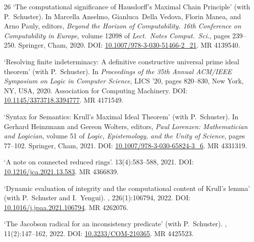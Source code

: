 \documentclass[a4paper]{article}
\begin{document}
\begin{flushleft}
\begin{thebibliography}{26}
\newblock `The computational significance of {H}ausdorff's {M}aximal {C}hain {P}rinciple' (with P.~Schuster).
\newblock In Marcella Anselmo, Gianluca~Della Vedova, Florin Manea, and Arno
  Pauly, editors, {\em Beyond the Horizon of Computability. 16th Conference on
  Computability in Europe}, volume 12098 of {\em Lect.~Notes Comput.~Sci.},
  pages 239--250. Springer, Cham, 2020.
\newblock DOI: \href{https://doi.org/10.1007/978-3-030-51466-2_21}{10.1007/978-3-030-51466-2\_21}.
\newblock MR 4139540.

\newblock `Resolving finite indeterminacy: A definitive constructive universal prime ideal theorem' (with P.~Schuster).
\newblock In {\em Proceedings of the 35th Annual ACM/IEEE Symposium on Logic in
  Computer Science}, LICS '20, pages 820--830, New York, NY, USA, 2020.
  Association for Computing Machinery.
\newblock DOI: \href{https://doi.org/10.1145/3373718.3394777}{10.1145/3373718.3394777}.
\newblock MR 4171549.

\newblock `Syntax for {S}emantics: {K}rull's {M}aximal {I}deal {T}heorem' (with P.~Schuster).
\newblock In Gerhard Heinzmann and Gereon Wolters, editors, {\em Paul Lorenzen:
  Mathematician and Logician}, volume 51 of {\em Logic, Epistemology, and the Unity of Science},
  pages 77--102. Springer, Cham, 2021.
\newblock DOI: \href{https://doi.org/10.1007/978-3-030-65824-3_6}{10.1007/978-3-030-65824-3\_6}.
\newblock MR 4331319.

\newblock `A note on connected reduced rings'.
 13(4):583--588, 2021.
\newblock DOI: \href{https://doi.org/10.1216/jca.2021.13.583}{10.1216/jca.2021.13.583}.
\newblock MR 4366839.

\newblock `Dynamic evaluation of integrity and the computational content of {K}rull's lemma' (with P.~Schuster and I.~Yengui).
, 226(1):106794, 2022.
\newblock DOI: \href{https://doi.org/10.1016/j.jpaa.2021.106794}{10.1016/j.jpaa.2021.106794}.
\newblock MR 4262076.

\newblock `The Jacobson radical for an inconsistency predicate' (with P.~Schuster).
, 11(2):147--162, 2022.
\newblock DOI: \href{https://doi.org/10.3233/COM-210365}{10.3233/COM-210365}.
\newblock MR 4425523.


\end{thebibliography}
\end{flushleft}
\end{document}
